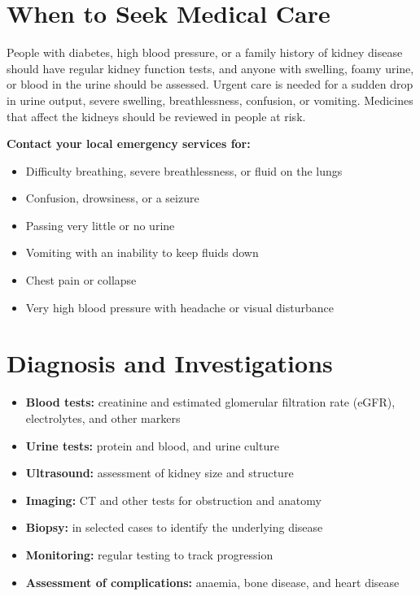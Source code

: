 \section*{When to Seek Medical Care}
People with diabetes, high blood pressure, or a family history of kidney disease should have regular kidney function tests, and anyone with swelling, foamy urine, or blood in the urine should be assessed. Urgent care is needed for a sudden drop in urine output, severe swelling, breathlessness, confusion, or vomiting. Medicines that affect the kidneys should be reviewed in people at risk.

\textbf{Contact your local emergency services for:}
\begin{itemize}
    \item Difficulty breathing, severe breathlessness, or fluid on the lungs
    \item Confusion, drowsiness, or a seizure
    \item Passing very little or no urine
    \item Vomiting with an inability to keep fluids down
    \item Chest pain or collapse
    \item Very high blood pressure with headache or visual disturbance
\end{itemize}

\section*{Diagnosis and Investigations}
\begin{itemize}
    \item \textbf{Blood tests:} creatinine and estimated glomerular filtration rate (eGFR), electrolytes, and other markers
    \item \textbf{Urine tests:} protein and blood, and urine culture
    \item \textbf{Ultrasound:} assessment of kidney size and structure
    \item \textbf{Imaging:} CT and other tests for obstruction and anatomy
    \item \textbf{Biopsy:} in selected cases to identify the underlying disease
    \item \textbf{Monitoring:} regular testing to track progression
    \item \textbf{Assessment of complications:} anaemia, bone disease, and heart disease
\end{itemize}

